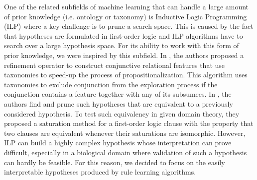 \documentclass{bmcart}
\begin{document}
One of the related subfields of machine learning that can handle a large amount of prior knowledge (i.e. ontology or taxonomy) is Inductive Logic Programming (ILP) where a key challenge is to prune a search space. This is caused by the fact that hypotheses are formulated in first-order logic and ILP algorithms have to search over a large hypothesis space. For its ability to work with this form of prior knowledge, we were inspired by this subfield. In \cite{vzakova2007exploiting}, the authors proposed a refinement operator to construct conjunctive relational features that use taxonomies to speed-up the process of propositionalization. This algorithm uses taxonomies to exclude conjunction from the exploration process if the conjunction contains a feature together with any of its subsumees. In \cite{svatovs2017pruning}, the authors find and prune such hypotheses that are equivalent to a previously considered hypothesis. To test such equivalency in given domain theory, they proposed a saturation method for a first-order logic clause with the property that two clauses are equivalent whenever their saturations are isomorphic. However, ILP can build a highly complex hypothesis whose interpretation can prove difficult, especially in a biological domain where validation of such a hypothesis can hardly be feasible. For this reason, we decided to focus on the easily interpretable hypotheses produced by rule learning algorithms.
\end{document}

